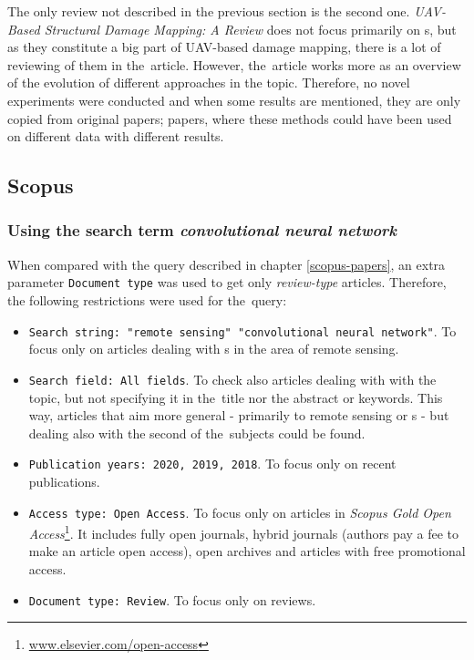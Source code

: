 The only review not described in the previous section is the second one. \textit{UAV-Based Structural Damage Mapping: A Review} does not focus primarily on s, but as they constitute a big part of UAV-based damage mapping, there is a lot of reviewing of them in the~article. However, the~article works more as an overview of the evolution of different approaches in the topic. Therefore, no novel experiments were conducted and when some results are mentioned, they are only copied from original papers; papers, where these methods could have been used on different data with different results.

\subsection{Scopus}
\label{scopus-reviews}

\subsubsection{Using the search term \textit{convolutional neural network}}
\label{scopus-reviews-full-length}

When compared with the query described in chapter \ref{scopus-papers}, an extra parameter \verb|Document type| was used to get only \textit{review-type} articles. Therefore, the following restrictions were used for the~query:

\begin{itemize}
	\item \verb|Search string: "remote sensing" "convolutional neural network"|. To focus only on articles dealing with s in the area of remote sensing.
	\item \verb|Search field: All fields|. To check also articles dealing with with the topic, but not specifying it in the~title nor the abstract or keywords. This way, articles that aim more general - primarily to remote sensing or s - but dealing also with the second of the~subjects could be found.
	\item \verb|Publication years: 2020, 2019, 2018|. To focus only on recent publications.
	\item \verb|Access type: Open Access|. To focus only on articles in \textit{Scopus Gold Open Access}\footnote{\url{www.elsevier.com/open-access}}. It includes fully open journals, hybrid journals (authors pay a fee to make an article open access), open archives and articles with free promotional access.
	\item \verb|Document type: Review|. To focus only on reviews.
\end{itemize}

